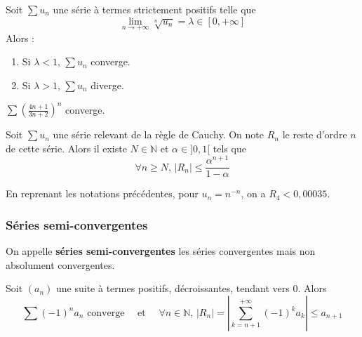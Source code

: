 
  \begin{proposition}
    Soit $\sum u_n$ une série à termes strictement positifs telle que
    \[ \lim_{n \rightarrow +\infty} \sqrt[n]{u_n} = \lambda \in [0, +\infty] \]
    Alors :
    \begin{enumerate}[label={\bfseries(\roman*)}]
      \item Si $\lambda < 1$, $\sum u_n$ converge.
      \item Si $\lambda > 1$, $\sum u_n$ diverge.
    \end{enumerate}
  \end{proposition}


  \begin{example}
    $\sum \left( \frac{4n+1}{3n+2} \right)^{n}$ converge.
  \end{example}


  \begin{proposition}
    Soit $\sum u_n$ une série relevant de la règle de Cauchy. On note $R_n$ le reste d'ordre $n$ de cette série. Alors il existe $N \in \mathbb{N}$ et $\alpha \in ]0,1[$ tels que
    \[ \forall n \geq N, \, |R_n| \leq \frac{\alpha^{n+1}}{1-\alpha} \]
  \end{proposition}

  \begin{example}
    En reprenant les notations précédentes, pour $u_n = n^{-n}$, on a $R_4 < 0,00035$.
  \end{example}

  \subsubsection{Séries semi-convergentes}


  \begin{definition}
    On appelle \textbf{séries semi-convergentes} les séries convergentes mais non absolument convergentes.
  \end{definition}

  \begin{theorem}
    Soit $(a_n)$ une suite à termes positifs, décroissantes, tendant vers $0$. Alors
    \[ \sum (-1)^n a_n \text{ converge} \quad \text{ et } \quad \forall n \in \mathbb{N}, \, |R_n| = \left| \sum_{k=n+1}^{+\infty} (-1)^k a_k \right| \leq a_{n+1} \]
  \end{theorem}

